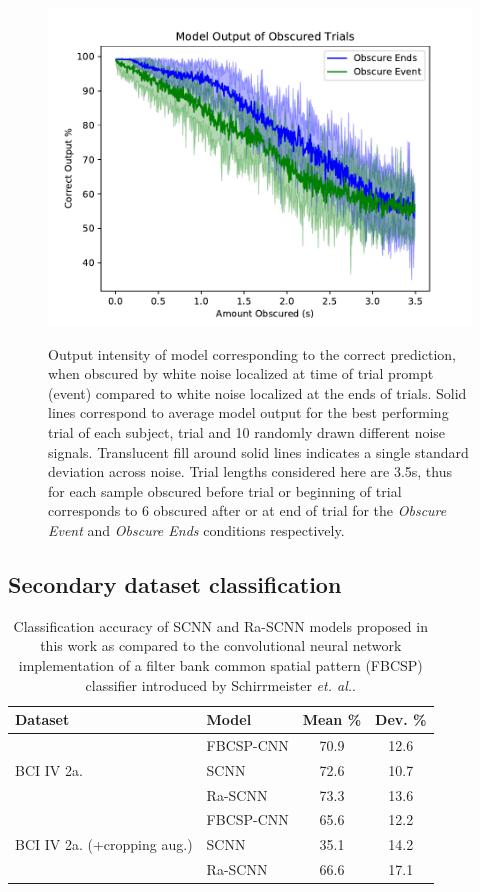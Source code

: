 \documentclass[fleqn,10pt]{wlscirep}
\begin{document}
\begin{figure}[h!]
  \caption{Output intensity of model corresponding to the correct prediction, when obscured by white noise localized at time of trial prompt (event) compared to white noise localized at the ends of trials. Solid lines correspond to average model output for the best performing trial of each subject, trial and 10 randomly drawn different noise signals. Translucent fill around solid lines indicates a single standard deviation across noise. Trial lengths considered here are 3.5s, thus for each sample obscured before trial or beginning of trial corresponds to 6 obscured after or at end of trial for the \textit{Obscure Event} and \textit{Obscure Ends} conditions respectively.}
  \centering\includegraphics[width=0.5\linewidth]{obscuring_profile.pdf}
 \label{fig:obsc_profile}
\end{figure}

\subsection*{Secondary dataset classification}

\begin{table}[h]
 \caption{Classification accuracy of SCNN and Ra-SCNN models proposed in this work as compared to the convolutional neural network implementation of a filter bank common spatial pattern (FBCSP) classifier introduced by Schirrmeister {\em et. al.}\cite{Schirrmeister2017}.}
 \centering
 \begin{tabular}{l l | c | c}
   \toprule
   \textbf{Dataset} & \textbf{Model} & \textbf{Mean \%} & \textbf{Dev. \%} \\
   \toprule
   \multirow{3}{*}{BCI IV 2a.}
                        & FBCSP-CNN           & 70.9 & 12.6  \\
                        & SCNN                & 72.6 & 10.7  \\
                        & Ra-SCNN             & 73.3 & 13.6  \\ 
   \midrule
   \multirow{3}{*}{BCI IV 2a. (+cropping aug.)}
                        & FBCSP-CNN           & 65.6 & 12.2  \\
                        & SCNN                & 35.1 & 14.2  \\
                        & Ra-SCNN             & 66.6 & 17.1  \\ 
   \bottomrule
 \end{tabular}
 \label{tab:sec_results}
\end{table}
\end{document}
